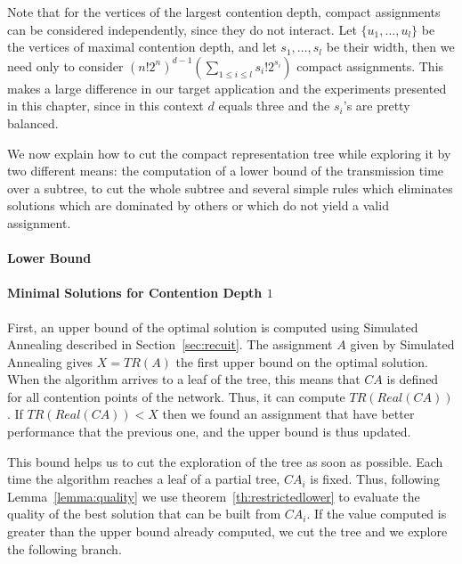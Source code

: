 
Note that for the vertices of the largest contention depth, compact assignments can be considered independently, since
they do not interact. Let $\{u_1,\dots,u_l\}$ be the vertices of maximal contention depth, and let $s_1,\dots,s_l$
be their width, then we need only to consider $(n!2^{n})^{d-1}(\sum_{1 \leq i\leq l} s_{i}!2^{s_i})$ compact assignments. This makes a large difference in our target application and the experiments presented in this chapter, since in this context $d$ equals three and the $s_i$'s are pretty balanced.

We now explain how to cut the compact representation tree while exploring it by two different means:
the computation of a lower bound of the transmission time over a subtree, to cut the whole subtree and 
several simple rules which eliminates solutions which are dominated by others or which do not yield a valid assignment.


\paragraph{Lower Bound}



\paragraph{Minimal Solutions for Contention Depth $1$}


First, an upper bound of the optimal solution is computed using Simulated Annealing described in Section~\ref{sec:recuit}. The assignment $A$ given by Simulated Annealing gives $X =TR(A)$ the first upper bound on the optimal solution.
When the algorithm arrives to a leaf of the tree, this means that $CA$ is defined for all contention points of the network. Thus, it can compute $TR(Real(CA))$. If $TR(Real(CA)) < X$ then we found an assignment that have better performance that the previous one, and the upper bound is thus updated.

This bound helps us to cut the exploration of the tree as soon as possible. Each time the algorithm reaches a leaf of a partial tree, $CA_i$ is fixed. Thus, following Lemma~\ref{lemma:quality} we use theorem~\ref{th:restrictedlower} to evaluate the quality of the best solution that can be built from $CA_i$. If the value computed is greater than the upper bound already computed, we cut the tree and we explore the following branch.




